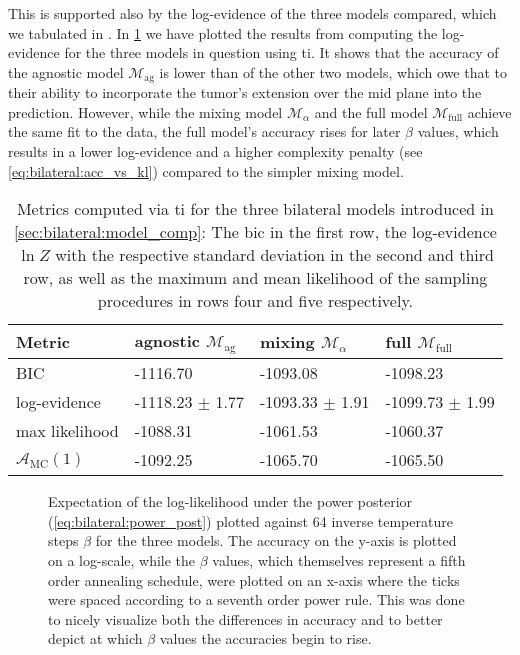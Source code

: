 \documentclass[\relativeRoot/main.tex]{subfiles}
\begin{document}
This is supported also by the log-evidence of the three models compared, which we tabulated in . In \cref{fig:bilateral:model_comp:thermo_int} we have plotted the results from computing the log-evidence for the three models in question using \gls{ti}. It shows that the accuracy of the agnostic model $\mathcal{M}_\text{ag}$ is lower than of the other two models, which owe that to their ability to incorporate the tumor's extension over the mid plane into the prediction. However, while the mixing model $\mathcal{M}_\alpha$ and the full model $\mathcal{M}_\text{full}$ achieve the same fit to the data, the full model's accuracy rises for later $\beta$ values, which results in a lower log-evidence and a higher complexity penalty (see \cref{eq:bilateral:acc_vs_kl}) compared to the simpler mixing model.

\begin{table}
    \centering
    \begin{tabular}{|l|l|l|l|}
        \hline
        \textbf{Metric} & \textbf{agnostic} $\mathcal{M}_\text{ag}$ & \textbf{mixing} $\mathcal{M}_\alpha$ & \textbf{full} $\mathcal{M}_\text{full}$ \\
        \hline
        BIC & -1116.70 & -1093.08 & -1098.23 \\
        log-evidence & -1118.23 $\pm$ 1.77 & -1093.33 $\pm$ 1.91 & -1099.73 $\pm$ 1.99 \\
        max likelihood & -1088.31 & -1061.53 & -1060.37 \\
        $\mathcal{A}_\text{MC}(1)$ & -1092.25 & -1065.70 & -1065.50 \\
        \hline
    \end{tabular}
    \caption{Metrics computed via \gls{ti} for the three bilateral models introduced in \cref{sec:bilateral:model_comp}: The \gls{bic} in the first row, the log-evidence $\ln{Z}$ with the respective standard deviation in the second and third row, as well as the maximum and mean likelihood of the sampling procedures in rows four and five respectively.}
    \label{table:bilateral:model_comp}
\end{table}

\begin{figure}
    \centering
    
    \caption{
        Expectation of the log-likelihood under the power posterior (\cref{eq:bilateral:power_post}) plotted against 64 inverse temperature steps $\beta$ for the three models. The accuracy on the y-axis is plotted on a log-scale, while the $\beta$ values, which themselves represent a fifth order annealing schedule, were plotted on an x-axis where the ticks were spaced according to a seventh order power rule. This was done to nicely visualize both the differences in accuracy and to better depict at which $\beta$ values the accuracies begin to rise.
    }
    \label{fig:bilateral:model_comp:thermo_int}
\end{figure}
\end{document}
